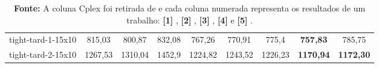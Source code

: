 \begin{table}
{\begin{tabular}{lcccccccc}
tight-tard-1-15x10  & 815,03          & 800,87          & 832,08          & 767,26  & 770,91          & 775,4                          & \textbf{757,83}     & 785,75        \\
tight-tard-2-15x10  & 1267,53         & 1310,04         & 1452,9          & 1224,82         & 1243,52         & 1226,23                & \textbf{1170,94}    & \textbf{1172,30}     \\
\hline
\end{tabular}
}
\caption*{\small \textbf{Fonte:} A coluna Cplex foi retirada de \cite{ahmadian2021meta} e cada coluna numerada representa os resultados de um trabalho: \textbf{[1]} \cite{dos2010combination}, \textbf{[2]} \cite{wang2014variable}, \textbf{[3]} \cite{ahmadian2021meta}, \textbf{[4]} \cite{abderrazzak2022adaptive} e \textbf{[5]} \cite{sabri2023reinforcement}.}
\end{table}


